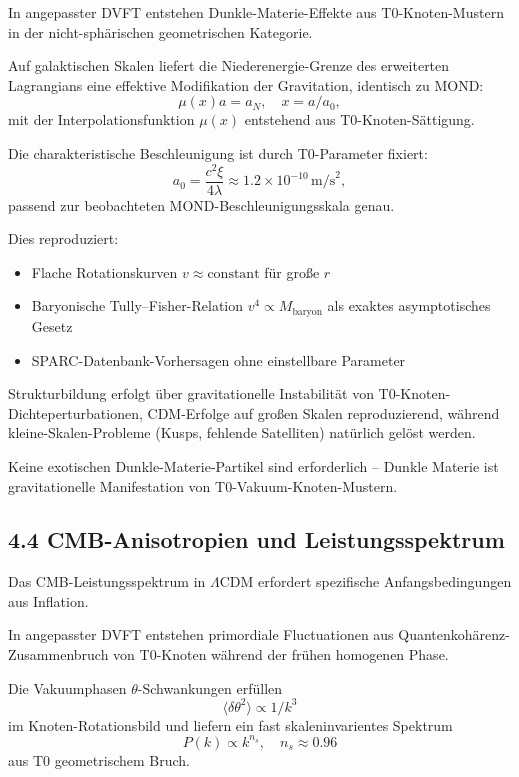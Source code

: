 	In angepasster DVFT entstehen Dunkle-Materie-Effekte aus T0-Knoten-Mustern in der nicht-sphärischen geometrischen Kategorie.
	
	Auf galaktischen Skalen liefert die Niederenergie-Grenze des erweiterten Lagrangians eine effektive Modifikation der Gravitation, identisch zu MOND:
	\[
	\mu(x) a = a_N, \quad x = a / a_0,
	\]
	mit der Interpolationsfunktion $\mu(x)$ entstehend aus T0-Knoten-Sättigung.
	
	Die charakteristische Beschleunigung ist durch T0-Parameter fixiert:
	\[
	a_0 = \frac{c^2 \xi}{4 \lambda} \approx 1.2 \times 10^{-10} \, \text{m/s}^2,
	\]
	passend zur beobachteten MOND-Beschleunigungsskala genau.
	
	Dies reproduziert:
	\begin{itemize}
		\item Flache Rotationskurven $v \approx \text{constant}$ für große $r$
		\item Baryonische Tully–Fisher-Relation $v^4 \propto M_{\text{baryon}}$ als exaktes asymptotisches Gesetz
		\item SPARC-Datenbank-Vorhersagen ohne einstellbare Parameter
	\end{itemize}
	
	Strukturbildung erfolgt über gravitationelle Instabilität von T0-Knoten-Dichteperturbationen, CDM-Erfolge auf großen Skalen reproduzierend, während kleine-Skalen-Probleme (Kusps, fehlende Satelliten) natürlich gelöst werden.
	
	Keine exotischen Dunkle-Materie-Partikel sind erforderlich – Dunkle Materie ist gravitationelle Manifestation von T0-Vakuum-Knoten-Mustern.
	
	\subsection{4.4 CMB-Anisotropien und Leistungsspektrum}
	
	Das CMB-Leistungsspektrum in $\Lambda$CDM erfordert spezifische Anfangsbedingungen aus Inflation.
	
	In angepasster DVFT entstehen primordiale Fluctuationen aus Quantenkohärenz-Zusammenbruch von T0-Knoten während der frühen homogenen Phase.
	
	Die Vakuumphasen $\theta$-Schwankungen erfüllen
	\[
	\langle \delta \theta^2 \rangle \propto 1/k^3
	\]
	im Knoten-Rotationsbild und liefern ein fast skaleninvarientes Spektrum
	\[
	P(k) \propto k^{n_s}, \quad n_s \approx 0.96
	\]
	aus T0 geometrischem Bruch.
	
